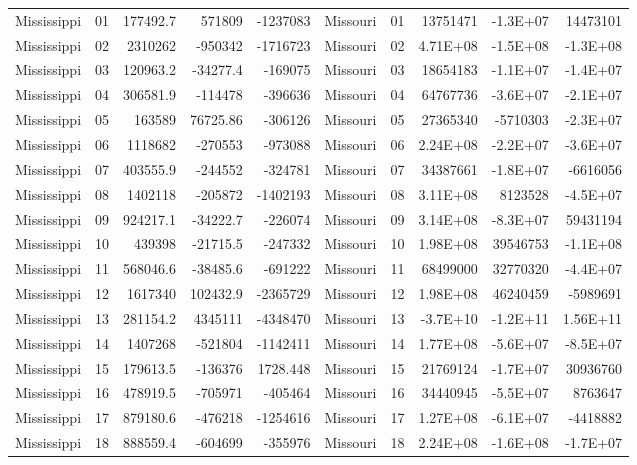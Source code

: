 \begin{landscape}
\begin{singlespace}
\begin{longtable}{lrrrr|lrrrr}
		Mississippi &  01  & 177492.7 & 571809 & -1237083 & Missouri &  01  & 13751471 & -1.3E+07 & 14473101 \\
		Mississippi &  02  & 2310262 & -950342 & -1716723 & Missouri &  02  & 4.71E+08 & -1.5E+08 & -1.3E+08 \\
		Mississippi &  03  & 120963.2 & -34277.4 & -169075 & Missouri &  03  & 18654183 & -1.1E+07 & -1.4E+07 \\
		Mississippi &  04  & 306581.9 & -114478 & -396636 & Missouri &  04  & 64767736 & -3.6E+07 & -2.1E+07 \\
		Mississippi &  05  & 163589 & 76725.86 & -306126 & Missouri &  05  & 27365340 & -5710303 & -2.3E+07 \\
		Mississippi &  06  & 1118682 & -270553 & -973088 & Missouri &  06  & 2.24E+08 & -2.2E+07 & -3.6E+07 \\
		Mississippi &  07  & 403555.9 & -244552 & -324781 & Missouri &  07  & 34387661 & -1.8E+07 & -6616056 \\
		Mississippi &  08  & 1402118 & -205872 & -1402193 & Missouri &  08  & 3.11E+08 & 8123528 & -4.5E+07 \\
		Mississippi &  09  & 924217.1 & -34222.7 & -226074 & Missouri &  09  & 3.14E+08 & -8.3E+07 & 59431194 \\
		Mississippi &  10 & 439398 & -21715.5 & -247332 & Missouri &  10 & 1.98E+08 & 39546753 & -1.1E+08 \\
		Mississippi &  11 & 568046.6 & -38485.6 & -691222 & Missouri &  11 & 68499000 & 32770320 & -4.4E+07 \\
		Mississippi &  12 & 1617340 & 102432.9 & -2365729 & Missouri &  12 & 1.98E+08 & 46240459 & -5989691 \\
		Mississippi &  13 & 281154.2 & 4345111 & -4348470 & Missouri &  13 & -3.7E+10 & -1.2E+11 & 1.56E+11 \\
		Mississippi &  14 & 1407268 & -521804 & -1142411 & Missouri &  14 & 1.77E+08 & -5.6E+07 & -8.5E+07 \\
		Mississippi &  15 & 179613.5 & -136376 & 1728.448 & Missouri &  15 & 21769124 & -1.7E+07 & 30936760 \\
		Mississippi &  16 & 478919.5 & -705971 & -405464 & Missouri &  16 & 34440945 & -5.5E+07 & 8763647 \\
		Mississippi &  17 & 879180.6 & -476218 & -1254616 & Missouri &  17 & 1.27E+08 & -6.1E+07 & -4418882 \\
		Mississippi &  18 & 888559.4 & -604699 & -355976 & Missouri &  18 & 2.24E+08 & -1.6E+08 & -1.7E+07 \\

\end{longtable}
\end{singlespace}
\end{landscape}
